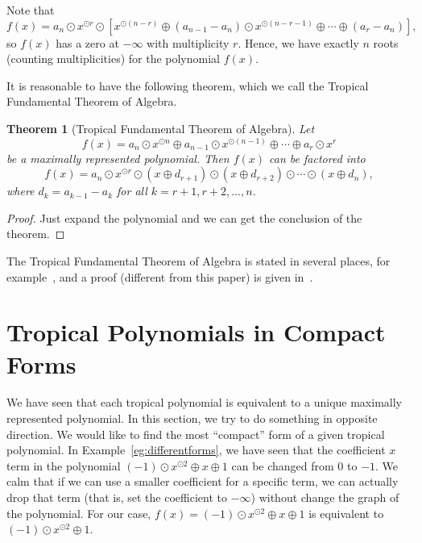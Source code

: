 \documentclass{amsart}
\newtheorem{thm}{Theorem}[section]
\theoremstyle{definition}
\theoremstyle{remark}
\begin{document}
Note that
\[
f(x) = a_n {\odot} x^{{\odot} r} {\odot}  [x^{{\odot} (n-r)} {\oplus} (a_{n-1} - a_n) {\odot} x^{{\odot} (n-r-1)}{\oplus} \cdots {\oplus} (a_r - a_n)],
\]
so $f(x)$ has a zero at $-\infty$ with multiplicity $r$. Hence, we have exactly $n$ roots (counting multiplicities) for the polynomial $f(x)$.

It is reasonable to have the following theorem, which we call the Tropical Fundamental Theorem of Algebra.

\begin{thm}[Tropical Fundamental Theorem of Algebra]\label{thm:tfta}
Let
\[
f(x) = a_n {\odot} x^{{\odot} n} {\oplus} a_{n-1} {\odot} x^{{\odot} (n -1)} {\oplus} \cdots {\oplus} a_r {\odot} x^r
\]
be a maximally represented polynomial. Then $f(x)$ can be factored into
\[
f(x) = a_n {\odot} x^{{\odot} r} {\odot}  (x {\oplus} d_{r+1}) {\odot} (x {\oplus} d_{r+2}) {\odot} \cdots {\odot} (x {\oplus} d_n),
\]
where $d_k = a_{k-1} - a_{k}$ for all $k = r+1, r+2, \ldots, n$. 
\end{thm}
\begin{proof}
Just expand the polynomial and we can get the conclusion of the theorem.
\end{proof}

The Tropical Fundamental Theorem of Algebra is stated in several places, for example~\cite{ss09}, and a proof (different from this paper) is given in~\cite{gm07}.

\section{Tropical Polynomials in Compact Forms}\label{s:compact}
We have seen that each tropical polynomial is equivalent to a unique maximally represented polynomial. In this section, we try to do something in opposite direction. We would like to find the most ``compact'' form of a given tropical polynomial. In Example~\ref{eg:differentforms}, we have seen that the coefficient $x$ term in the polynomial $(-1){\odot} x^{{\odot} 2} {\oplus} x{\oplus} 1$ can be changed from $0$ to $-1$. We calm that if we can use a smaller coefficient for a specific term, we can actually drop that term (that is, set the coefficient to $-\infty$) without change the graph of the polynomial. For our case, $f(x) = (-1){\odot} x^{{\odot} 2} {\oplus} x{\oplus} 1$ is equivalent to $(-1) {\odot} x^{{\odot}2} {\oplus} 1$.
\end{document}
